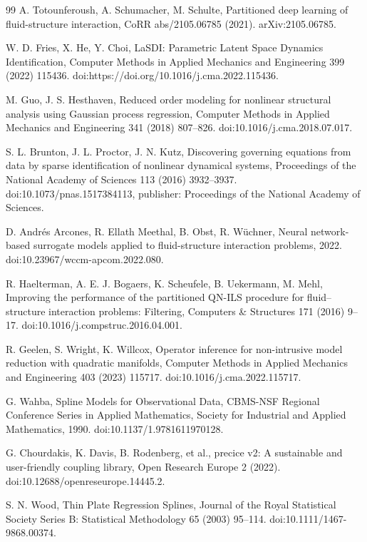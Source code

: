 \documentclass[11pt]{article}
\begin{document}
\begin{thebibliography}{99}
A. Totounferoush, A. Schumacher, M. Schulte, Partitioned deep learning of fluid-structure interaction, CoRR abs/2105.06785 (2021). arXiv:2105.06785.

W. D. Fries, X. He, Y. Choi, LaSDI: Parametric Latent Space Dynamics Identification, Computer Methods in Applied Mechanics and Engineering 399 (2022) 115436. doi:https://doi.org/10.1016/j.cma.2022.115436.

M. Guo, J. S. Hesthaven, Reduced order modeling for nonlinear structural analysis using Gaussian process regression, Computer Methods in Applied Mechanics and Engineering 341 (2018) 807--826. doi:10.1016/j.cma.2018.07.017.

S. L. Brunton, J. L. Proctor, J. N. Kutz, Discovering governing equations from data by sparse identification of nonlinear dynamical systems, Proceedings of the National Academy of Sciences 113 (2016) 3932--3937. doi:10.1073/pnas.1517384113, publisher: Proceedings of the National Academy of Sciences.

D. Andr\'es Arcones, R. Ellath Meethal, B. Obst, R. W\"uchner, Neural network-based surrogate models applied to fluid-structure interaction problems, 2022. doi:10.23967/wccm-apcom.2022.080.

R. Haelterman, A. E. J. Bogaers, K. Scheufele, B. Uekermann, M. Mehl, Improving the performance of the partitioned QN-ILS procedure for fluid--structure interaction problems: Filtering, Computers \& Structures 171 (2016) 9--17. doi:10.1016/j.compstruc.2016.04.001.

R. Geelen, S. Wright, K. Willcox, Operator inference for non-intrusive model reduction with quadratic manifolds, Computer Methods in Applied Mechanics and Engineering 403 (2023) 115717. doi:10.1016/j.cma.2022.115717.

G. Wahba, Spline Models for Observational Data, CBMS-NSF Regional Conference Series in Applied Mathematics, Society for Industrial and Applied Mathematics, 1990. doi:10.1137/1.9781611970128.

G. Chourdakis, K. Davis, B. Rodenberg, et al., precice v2: A sustainable and user-friendly coupling library, Open Research Europe 2 (2022). doi:10.12688/openreseurope.14445.2.

S. N. Wood, Thin Plate Regression Splines, Journal of the Royal Statistical Society Series B: Statistical Methodology 65 (2003) 95--114. doi:10.1111/1467-9868.00374.


\end{thebibliography}
\end{document}
